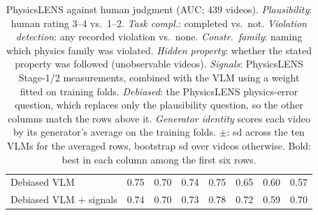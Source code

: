 \begin{table}[t]
\begin{tabular}{@{}lccc|cccc@{}}
        Debiased VLM & 0.75 & 0.70 & 0.74 & 0.75 & 0.65 & 0.60 & 0.57 \\
        Debiased VLM + signals & 0.74 & 0.70 & 0.73 & 0.78 & 0.72 & 0.59 & 0.70 \\
        \bottomrule
    \end{tabular}
    \caption{PhysicsLENS against human judgment (AUC; 439 videos). \emph{Plausibility}: human rating 3--4 vs.\ 1--2. \emph{Task compl.}: completed vs.\ not. \emph{Violation detection}: any recorded violation vs.\ none. \emph{Constr.\ family}: naming which physics family was violated. \emph{Hidden property}: whether the stated property was followed (unobservable videos). \emph{Signals}: PhysicsLENS Stage-1/2 measurements, combined with the VLM using a weight fitted on training folds. \emph{Debiased}: the PhysicsLENS physics-error question, which replaces only the plausibility question, so the other columns match the rows above it. \emph{Generator identity} scores each video by its generator's average on the training folds. $\pm$: sd across the ten VLMs for the averaged rows, bootstrap sd over videos otherwise. Bold: best in each column among the first six rows.}
    \label{tab:main-results}
\end{table}
